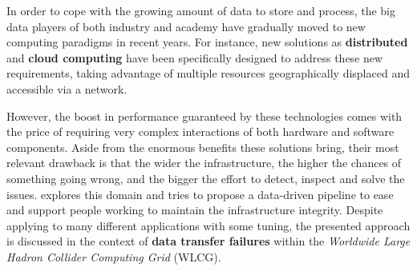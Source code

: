 In order to cope with the growing amount of data to store and process, the big data players of both industry and academy have gradually moved to new computing paradigms in recent years. 
For instance, new solutions as \textbf{distributed} and \textbf{cloud computing}  have been specifically designed to address these new requirements, taking advantage of multiple resources geographically displaced and accessible via a network.

However, the boost in performance guaranteed by these technologies comes with the price of requiring very complex interactions of both hardware and software components. 
Aside from the enormous benefits these solutions bring, their most relevant drawback is that the wider the infrastructure, the higher the chances of something going wrong, and the bigger the effort to detect, inspect and solve the issues.
 explores this domain and tries to propose a data-driven pipeline to ease and support people working to maintain the infrastructure integrity.
Despite applying to many different applications with some tuning, the presented approach is discussed in the context of \textbf{data transfer failures} within the \emph{Worldwide Large Hadron Collider Computing Grid} (WLCG).

